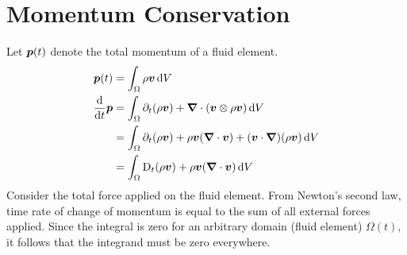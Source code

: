 \section{Momentum Conservation}
Let $\boldsymbol{p}(t)$ denote the total momentum of a fluid element.
\begin{equation}
\begin{split}
    \boldsymbol{p}(t) &= \int_{\Omega}\rho\boldsymbol{v}\,\mathrm{d} V \\
    \dfrac{\mathrm{d}}{\mathrm{d} t}\boldsymbol{p} &= \int_{\Omega}\partial_{t}(\rho\boldsymbol{v}) + \boldsymbol{\nabla}\cdot(\boldsymbol{v}\otimes\rho\boldsymbol{v})   \,\mathrm{d} V \\
    &=\int_{\Omega}\partial_{t}(\rho\boldsymbol{v}) + \rho\boldsymbol{v}(\boldsymbol{\nabla}\cdot\boldsymbol{v}) + (\boldsymbol{v}\cdot\boldsymbol{\nabla})(\rho\boldsymbol{v}) \,\mathrm{d} V \\
    &=\int_{\Omega}\mathrm{D}_{t}(\rho\boldsymbol{v}) + \rho\boldsymbol{v}(\boldsymbol{\nabla}\cdot\boldsymbol{v}) \,\mathrm{d} V
\end{split}
\end{equation}
Consider the total force applied on the fluid element.
From Newton's second law, time rate of change of momentum is equal to the sum of all external forces applied.
Since the integral is zero for an arbitrary domain (fluid element) $\Omega(t),$ it follows that the integrand must be zero everywhere.
